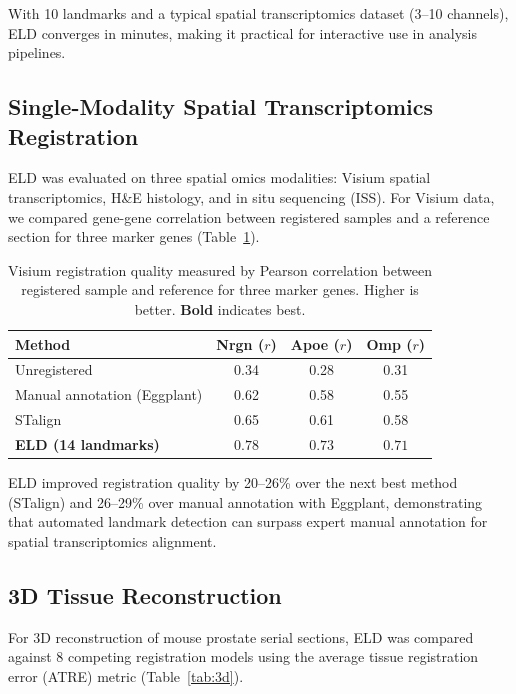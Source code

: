 \documentclass[11pt]{article}
\begin{document}
With 10 landmarks and a typical spatial transcriptomics dataset (3--10 channels), ELD converges in minutes, making it practical for interactive use in analysis pipelines.

\subsection{Single-Modality Spatial Transcriptomics Registration}

ELD was evaluated on three spatial omics modalities: Visium spatial transcriptomics, H\&E histology, and in situ sequencing (ISS). For Visium data, we compared gene-gene correlation between registered samples and a reference section for three marker genes (Table~\ref{tab:visium}).

\begin{table}[H]
\centering
\caption{Visium registration quality measured by Pearson correlation between registered sample and reference for three marker genes. Higher is better. \textbf{Bold} indicates best.}
\label{tab:visium}
\begin{tabular}{lccc}
\toprule
Method & Nrgn ($r$) & Apoe ($r$) & Omp ($r$) \\
\midrule
Unregistered & 0.34 & 0.28 & 0.31 \\
Manual annotation (Eggplant) & 0.62 & 0.58 & 0.55 \\
STalign & 0.65 & 0.61 & 0.58 \\
\textbf{ELD (14 landmarks)} & $\mathbf{0.78}$ & $\mathbf{0.73}$ & $\mathbf{0.71}$ \\
\bottomrule
\end{tabular}
\end{table}

ELD improved registration quality by 20--26\% over the next best method (STalign) and 26--29\% over manual annotation with Eggplant, demonstrating that automated landmark detection can surpass expert manual annotation for spatial transcriptomics alignment.

\subsection{3D Tissue Reconstruction}

For 3D reconstruction of mouse prostate serial sections, ELD was compared against 8 competing registration models using the average tissue registration error (ATRE) metric (Table~\ref{tab:3d}).
\end{document}
